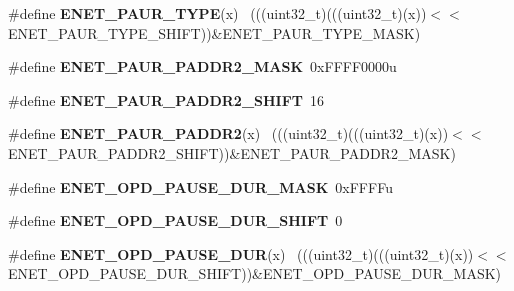 \begin{DoxyCompactItemize}
\item 
\hypertarget{group___e_n_e_t___register___masks_ga51aaa8851986bd0af9248e04ee8bf372}{}\#define {\bfseries E\+N\+E\+T\+\_\+\+P\+A\+U\+R\+\_\+\+T\+Y\+P\+E}(x)                                            ~(((uint32\+\_\+t)(((uint32\+\_\+t)(x))$<$$<$E\+N\+E\+T\+\_\+\+P\+A\+U\+R\+\_\+\+T\+Y\+P\+E\+\_\+\+S\+H\+I\+F\+T))\&E\+N\+E\+T\+\_\+\+P\+A\+U\+R\+\_\+\+T\+Y\+P\+E\+\_\+\+M\+A\+S\+K)\label{group___e_n_e_t___register___masks_ga51aaa8851986bd0af9248e04ee8bf372}

\item 
\hypertarget{group___e_n_e_t___register___masks_ga704d9ce6ebfb6b00ae75c12cd226c30c}{}\#define {\bfseries E\+N\+E\+T\+\_\+\+P\+A\+U\+R\+\_\+\+P\+A\+D\+D\+R2\+\_\+\+M\+A\+S\+K}~0x\+F\+F\+F\+F0000u\label{group___e_n_e_t___register___masks_ga704d9ce6ebfb6b00ae75c12cd226c30c}

\item 
\hypertarget{group___e_n_e_t___register___masks_ga8a4febd50d867c00d02977b3a4a865dd}{}\#define {\bfseries E\+N\+E\+T\+\_\+\+P\+A\+U\+R\+\_\+\+P\+A\+D\+D\+R2\+\_\+\+S\+H\+I\+F\+T}~16\label{group___e_n_e_t___register___masks_ga8a4febd50d867c00d02977b3a4a865dd}

\item 
\hypertarget{group___e_n_e_t___register___masks_gafc83c91ca900691fad0ed0106b07d4a8}{}\#define {\bfseries E\+N\+E\+T\+\_\+\+P\+A\+U\+R\+\_\+\+P\+A\+D\+D\+R2}(x)                                        ~(((uint32\+\_\+t)(((uint32\+\_\+t)(x))$<$$<$E\+N\+E\+T\+\_\+\+P\+A\+U\+R\+\_\+\+P\+A\+D\+D\+R2\+\_\+\+S\+H\+I\+F\+T))\&E\+N\+E\+T\+\_\+\+P\+A\+U\+R\+\_\+\+P\+A\+D\+D\+R2\+\_\+\+M\+A\+S\+K)\label{group___e_n_e_t___register___masks_gafc83c91ca900691fad0ed0106b07d4a8}

\item 
\hypertarget{group___e_n_e_t___register___masks_ga1c63364c148916da71bb917ea8d96adf}{}\#define {\bfseries E\+N\+E\+T\+\_\+\+O\+P\+D\+\_\+\+P\+A\+U\+S\+E\+\_\+\+D\+U\+R\+\_\+\+M\+A\+S\+K}~0x\+F\+F\+F\+Fu\label{group___e_n_e_t___register___masks_ga1c63364c148916da71bb917ea8d96adf}

\item 
\hypertarget{group___e_n_e_t___register___masks_ga0cd72f21fa65e5ce01260fdf303bc9e2}{}\#define {\bfseries E\+N\+E\+T\+\_\+\+O\+P\+D\+\_\+\+P\+A\+U\+S\+E\+\_\+\+D\+U\+R\+\_\+\+S\+H\+I\+F\+T}~0\label{group___e_n_e_t___register___masks_ga0cd72f21fa65e5ce01260fdf303bc9e2}

\item 
\hypertarget{group___e_n_e_t___register___masks_gae0ac269def0f4c2d230d2dbe768b9f49}{}\#define {\bfseries E\+N\+E\+T\+\_\+\+O\+P\+D\+\_\+\+P\+A\+U\+S\+E\+\_\+\+D\+U\+R}(x)                                    ~(((uint32\+\_\+t)(((uint32\+\_\+t)(x))$<$$<$E\+N\+E\+T\+\_\+\+O\+P\+D\+\_\+\+P\+A\+U\+S\+E\+\_\+\+D\+U\+R\+\_\+\+S\+H\+I\+F\+T))\&E\+N\+E\+T\+\_\+\+O\+P\+D\+\_\+\+P\+A\+U\+S\+E\+\_\+\+D\+U\+R\+\_\+\+M\+A\+S\+K)\label{group___e_n_e_t___register___masks_gae0ac269def0f4c2d230d2dbe768b9f49}


\end{DoxyCompactItemize}
